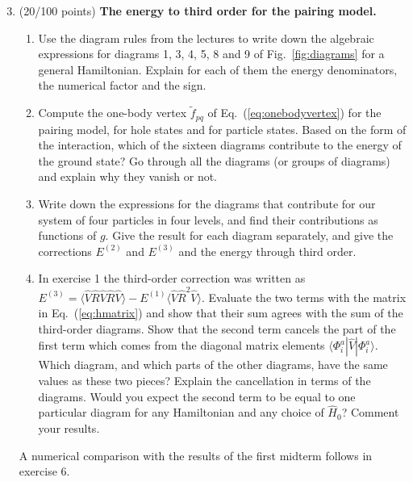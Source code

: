 \documentclass[prc]{revtex4}
\begin{document}
\begin{enumerate}
\setcounter{enumi}{2}

\item (20/100 points) \textbf{The energy to third order for the pairing model.}
\begin{enumerate}
\item Use the diagram rules from the lectures to write down the
  algebraic expressions for diagrams 1, 3, 4, 5, 8 and 9 of
  Fig.~\ref{fig:diagrams} for a general Hamiltonian. Explain for each
  of them the energy denominators, the numerical factor and the sign.
\item Compute the one-body vertex $\tilde{f}_{pq}$ of
  Eq.~(\ref{eq:onebodyvertex}) for the pairing model, for hole states
  and for particle states. Based on the form of the interaction, which
  of the sixteen diagrams contribute to the energy of the ground
  state? Go through all the diagrams (or groups of diagrams) and
  explain why they vanish or not.
\item Write down the expressions for the diagrams that contribute for
  our system of four particles in four levels, and find their
  contributions as functions of $g$. Give the result for each diagram
  separately, and give the corrections $E^{(2)}$ and $E^{(3)}$ and the
  energy through third order.
\item In exercise 1 the third-order correction was written as
  $E^{(3)}=\langle\hat{V}\hat{R}\hat{V}\hat{R}\hat{V}\rangle
  -E^{(1)}\langle\hat{V}\hat{R}^2\hat{V}\rangle$.
  Evaluate the two terms with the matrix in Eq.~(\ref{eq:hmatrix}) and
  show that their sum agrees with the sum of the third-order
  diagrams. Show that the second term cancels the part of the first
  term which comes from the diagonal matrix elements
  $\langle\Phi_i^a|\hat{V}|\Phi_i^a\rangle$. Which diagram, and which
  parts of the other diagrams, have the same values as these two
  pieces? Explain the cancellation in terms of the diagrams. Would you
  expect the second term to be equal to one particular diagram for any
  Hamiltonian and any choice of $\hat{H}_0$? Comment your results.
\end{enumerate}
A numerical comparison with the results of the first midterm follows
in exercise 6.


\end{enumerate}
\end{document}
